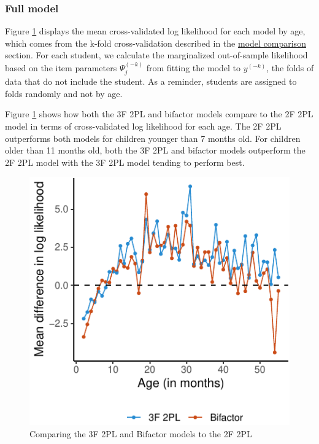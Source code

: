 \documentclass[10pt, letterpaper]{article}
\newenvironment{CodeChunk}{}{}
\begin{document}
\vskip 0.1in

\hypertarget{full}{%
\subsubsection{Full model}\label{full}}

Figure \ref{fig:byage} displays the mean cross-validated log likelihood
for each model by age, which comes from the k-fold cross-validation
described in the \protect\hyperlink{modelcompare}{model comparison}
section. For each student, we calculate the marginalized out-of-sample
likelihood based on the item parameters \(\Psi_j^{(-k)}\) from fitting
the model to \(y^{(-k)}\), the folds of data that do not include the
student. As a reminder, students are assigned to folds randomly and not
by age.

Figure \ref{fig:byage} shows how both the 3F 2PL and bifactor models
compare to the 2F 2PL model in terms of cross-validated log likelihood
for each age. The 2F 2PL outperforms both models for children younger
than 7 months old. For children older than 11 months old, both the 3F
2PL and bifactor models outperform the 2F 2PL model with the 3F 2PL
model tending to perform best.

\begin{CodeChunk}
\begin{figure}[tb]
\includegraphics{figs/byage-1} \caption[Comparing the 3F 2PL and Bifactor models to the 2F 2PL]{Comparing the 3F 2PL and Bifactor models to the 2F 2PL}\label{fig:byage}
\end{figure}
\end{CodeChunk}
\end{document}
